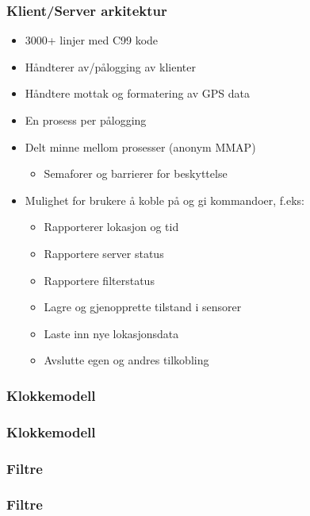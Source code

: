 \documentclass[xcolor=table]{beamer}
\begin{document}
\begin{frame}
  \frametitle{Klient/Server arkitektur}
  \begin{itemize}
    \item 3000+ linjer med C99 kode
    \item Håndterer av/pålogging av klienter
    \item Håndtere mottak og formatering av GPS data
    \item En prosess per pålogging
    \item Delt minne mellom prosesser (anonym MMAP)
      \begin{itemize}
        \item Semaforer og barrierer for beskyttelse
      \end{itemize}
    \item Mulighet for brukere å koble på og gi kommandoer, f.eks:
      \begin{itemize}
        \item Rapporterer lokasjon og tid
        \item Rapportere server status
        \item Rapportere filterstatus
        \item Lagre og gjenopprette tilstand i sensorer
        \item Laste inn nye lokasjonsdata
        \item Avslutte egen og andres tilkobling
      \end{itemize}
  \end{itemize}
\end{frame}

\subsubsection{Klokkemodell}
\begin{frame}
  \frametitle{Klokkemodell}

\end{frame}

\subsubsection{Filtre}
\begin{frame}
  \frametitle{Filtre}
  
\end{frame}
\end{document}
